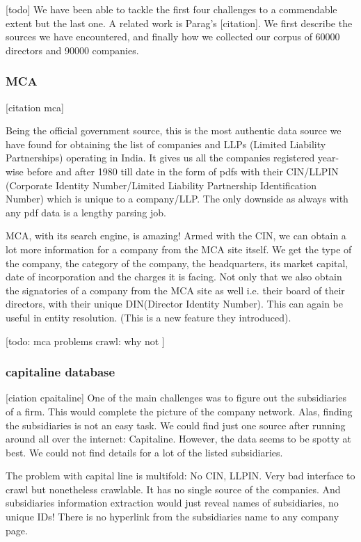 [todo]
We have been able to tackle the first four challenges to a commendable extent but the last one. A related work is Parag's [citation]. We first describe the sources we have encountered, and finally how we collected our corpus of 60000 directors and 90000 companies.

\subsubsection{MCA}
[citation mca]

Being the official government source, this is the most authentic data source we have found for obtaining the list of companies and LLPs (Limited Liability Partnerships) operating in India. It gives us all the companies registered year-wise before and after 1980 till date in the form of pdfs with their CIN/LLPIN (Corporate Identity Number/Limited Liability Partnership Identification Number) which is unique to a company/LLP. The only downside as always with any pdf data is a lengthy parsing job.

MCA, with its search engine, is amazing! Armed with the CIN, we can obtain a lot more information for a company from the MCA site itself. We get the type of the company, the category of the company, the headquarters, its market capital, date of incorporation and the charges it is facing. Not only that we also obtain the signatories of a company from the MCA site as well i.e. their board of their directors, with their unique DIN(Director Identity Number). This can again be useful in entity resolution. (This is a new feature they introduced).

[todo: mca problems
crawl: why not
]


\subsubsection{capitaline database}
[ciation cpaitaline]
One of the main challenges was to figure out the subsidiaries of a firm. This would complete the picture of the company network. Alas, finding the subsidiaries is not an easy task. We could find just one source after running around all over the internet:  Capitaline. However, the data seems to be spotty at best. We could not find details for a lot of the listed subsidiaries.

The problem with capital line is multifold: No CIN, LLPIN. Very bad interface to crawl but nonetheless crawlable. It has no single source of the companies. And subsidiaries information extraction would just reveal names of subsidiaries, no unique IDs! There is no hyperlink from the subsidiaries name to any company page.

